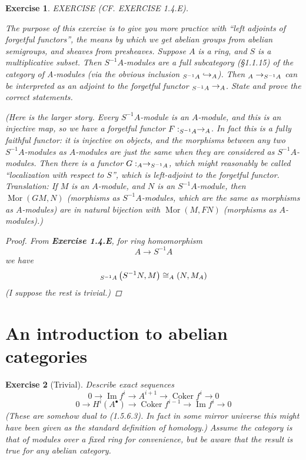 \documentclass{article}
\theoremstyle{breakstyle}
\newtheorem{exercise}{Exercise}[section]
\DeclareMathOperator{\mor}{Mor}
\DeclareMathOperator{\coker}{Coker}
\DeclareMathOperator{\im}{Im}
\let\hom\relax
\DeclareMathOperator{\hom}{Hom}
\let\mod\relax
\DeclareMathOperator{\mod}{Mod}
\begin{document}
\begin{exercise}
EXERCISE (CF. EXERCISE 1.4.E).

The purpose of this exercise is to give you more practice with ``left
adjoints of forgetful functors'', the means by which we get abelian groups
from abelian semigroups, and sheaves from presheaves. Suppose $A$ is a ring,
and $S$ is a multiplicative subset. Then $S^{-1}A$-modules are a full
subcategory (\S\emph{1.1.15}) of the category of A-modules (via the obvious
inclusion $\mod_{S^{-1}A} \hookrightarrow \mod_{A}$). Then $\mod_{A} \to
\mod_{S^{-1}A}$ can be interpreted as an adjoint to the forgetful functor
$\mod_{S^{-1}A} \to \mod_{A}$. State and prove the correct statements.

(Here is the larger story. Every $S^{-1}A$-module is an $A$-module, and this
is an injective map, so we have a forgetful functor $F: \mod_{S^{-1}A} \to
\mod_{A}$. In fact this is a fully faithful functor: it is injective on
objects, and the morphisms between any two $S^{-1}A$-modules as $A$-modules
are just the same when they are considered as $S^{-1}A$-modules. Then there
is a functor $G: \mod_{A} \to \mod_{S^{-1}A}$, which might reasonably be
called ``localization with respect to $S$'', which is left-adjoint to the
forgetful functor. Translation: If $M$ is an $A$-module, and $N$ is an
$S^{-1}A$-module, then $\mor(GM, N)$ (morphisms as $S^{-1}A$-modules, which
are the same as morphisms as $A$-modules) are in natural bijection with
$\mor(M, FN)$ (morphisms as $A$-modules).)

\begin{proof}
    From \textbf{Exercise 1.4.E}, for ring homomorphism
    $$
    A\longrightarrow S^{-1}A
    $$
    we have
    $$
    \hom_{S^{-1}A}\left( S^{-1}N,M \right) \cong \hom_{A}\left( N,M_{A} \right) 
    $$
    \emph{(I suppose the rest is trivial.)}
\end{proof}

\end{exercise}

\section{An introduction to abelian categories}

\begin{exercise}[Trivial]
Describe exact sequences
$$
0 \longrightarrow \im f^{i} \longrightarrow A^{i+1} \longrightarrow
\coker f^{i} \longrightarrow 0
$$
$$
0 \longrightarrow H^{i}(A^{\bullet}) \longrightarrow \coker f^{i-1}
\longrightarrow \im f^{i} \longrightarrow 0
$$
(These are somehow dual to (1.5.6.3). In fact in some mirror universe this
might have been given as the standard definition of homology.) Assume the
category is that of modules over a fixed ring for convenience, but be aware
that the result is true for any abelian category.
\end{exercise}
\end{document}
